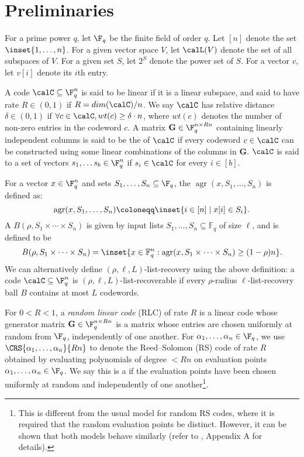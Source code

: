 \documentclass{article}
\DeclareMathOperator{\agr}{agr}
\begin{document}
\section{Preliminaries}
For a prime power $q$, let $\F_q$ be the finite field of order $q$.
Let $[n]$ denote the set $\inset{1,\ldots,n}$.
For a given vector space $V$, let $\calL(V)$ denote the set of all subspaces of $V$.
For a given set $S$, let $2^S$ denote the power set of $S$.
For a vector $v$, let $v[i]$ denote its $i$th entry.

A code $\calC \subseteq \F_q^n$ is said to be linear if it is a linear subspace, and said to have rate $R \in (0, 1)$ if $R=dim(\calC)/n$.
We say $\calC$ has relative distance $\delta \in (0, 1)$ if $\forall c \in \calC, wt(c) \geq \delta \cdot n$, where $wt(c)$ denotes the number of non-zero entries in the codeword $c$.
A matrix $\mathbf{G} \in \F_q^{n \times Rn}$ containing linearly independent columns is said to be the  of $\calC$ if every codeword $c \in \calC$ can be constructed using some linear combinations of the columns in $\mathbf{G}$.
$\calC$ is said to  a set of vectors $s_1,\ldots s_b \in \F_q^n$ if $s_i \in \calC$ for every $i \in [b]$. 

For a vector $x \in \F_q^n$ and sets $S_1,\ldots,S_n \subseteq \F_q$, the  $\agr(x, S_1,\ldots,S_n)$ is defined as:
\[
    \agr(x, S_1,\ldots,S_n) \coloneqq \inset{i \in [n] \mid x[i] \in S_i}.
\]
A  $B(\rho, S_1\times\cdots\times S_n)$ is given by input lists $S_1,\dots,S_n\subseteq\mathbb{F}_q$ of size $\ell$, and is defined to be
\begin{align}
    B(\rho, S_1\times\cdots\times S_n) = 
    \inset{x\in\mathbb{F}_q^n: \agr(x, S_1\times \dots\times S_n)\ge (1-\rho)n}.
\end{align}
We can alternatively define $(\rho, \ell, L)$-list-recovery using the above definition: a code $\calC \subseteq \F_q^n$ is $(\rho, \ell, L)$-list-recoverable if every $\rho$-radius $\ell$-list-recovery ball $B$ contains at most $L$ codewords.

For $0<R<1$, a \emph{random linear code} (RLC) of rate $R$ is a linear code whose generator matrix $\mathbf{G} \in \F_q^{n \times Rn}$ is a matrix whose entries are chosen uniformly at random from $\F_q$, independently of one another.
For $\alpha_1,\ldots,\alpha_n \in \F_q$, we use $\CRS{\alpha_1,\ldots,\alpha_n}{Rn}$ to denote the Reed--Solomon (RS) code of rate $R$ obtained by evaluating polynomials of degree $<Rn$ on evaluation points $\alpha_1,\ldots,\alpha_n \in \F_q$.
We say this is a  if the evaluation points have been chosen uniformly at random and independently of one another\footnote{This is different from the usual model for random RS codes, where it is required that the random evaluation points be distinct. However, it can be shown that both models behave similarly (refer to \cite{levi2024random}, Appendix A for details).}.
\end{document}
